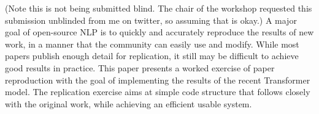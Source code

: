(Note this is not being submitted blind. The chair of the workshop requested this submission unblinded from me on twitter, so assuming that is okay.) A major goal of open-source NLP is to quickly and accurately reproduce the results of new work, in a manner that the community can easily use and modify. While most papers publish enough detail for replication, it still may be difficult to achieve good results in practice. This paper presents a worked exercise of paper reproduction with the goal of implementing the results of the recent Transformer model. The replication exercise aims at simple code structure that follows closely with the original work, while achieving an efficient usable system.

